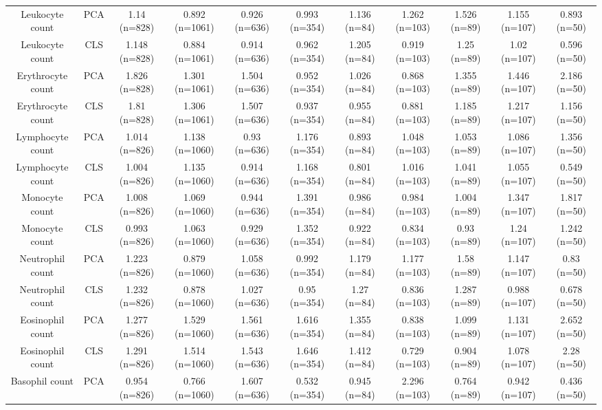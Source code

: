 \begin{landscape}
\begin{table}[!htbp]
\begin{tabular}{ ccccccccccc}
Leukocyte count & PCA & 1.14 (n=828) & 0.892 (n=1061) & 0.926 (n=636) & 0.993 (n=354) & 1.136 (n=84) & 1.262 (n=103) & 1.526 (n=89) & 1.155 (n=107) & 0.893 (n=50) \\ 
Leukocyte count & CLS & 1.148 (n=828) & 0.884 (n=1061) & 0.914 (n=636) & 0.962 (n=354) & 1.205 (n=84) & 0.919 (n=103) & 1.25 (n=89) & 1.02 (n=107) & 0.596 (n=50) \\ 
Erythrocyte count & PCA & 1.826 (n=828) & 1.301 (n=1061) & 1.504 (n=636) & 0.952 (n=354) & 1.026 (n=84) & 0.868 (n=103) & 1.355 (n=89) & 1.446 (n=107) & 2.186 (n=50) \\ 
Erythrocyte count & CLS & 1.81 (n=828) & 1.306 (n=1061) & 1.507 (n=636) & 0.937 (n=354) & 0.955 (n=84) & 0.881 (n=103) & 1.185 (n=89) & 1.217 (n=107) & 1.156 (n=50) \\ 
Lymphocyte count & PCA & 1.014 (n=826) & 1.138 (n=1060) & 0.93 (n=636) & 1.176 (n=354) & 0.893 (n=84) & 1.048 (n=103) & 1.053 (n=89) & 1.086 (n=107) & 1.356 (n=50) \\ 
Lymphocyte count & CLS & 1.004 (n=826) & 1.135 (n=1060) & 0.914 (n=636) & 1.168 (n=354) & 0.801 (n=84) & 1.016 (n=103) & 1.041 (n=89) & 1.055 (n=107) & 0.549 (n=50) \\ 
Monocyte count & PCA & 1.008 (n=826) & 1.069 (n=1060) & 0.944 (n=636) & 1.391 (n=354) & 0.986 (n=84) & 0.984 (n=103) & 1.004 (n=89) & 1.347 (n=107) & 1.817 (n=50) \\ 
Monocyte count & CLS & 0.993 (n=826) & 1.063 (n=1060) & 0.929 (n=636) & 1.352 (n=354) & 0.922 (n=84) & 0.834 (n=103) & 0.93 (n=89) & 1.24 (n=107) & 1.242 (n=50) \\ 
Neutrophil count & PCA & 1.223 (n=826) & 0.879 (n=1060) & 1.058 (n=636) & 0.992 (n=354) & 1.179 (n=84) & 1.177 (n=103) & 1.58 (n=89) & 1.147 (n=107) & 0.83 (n=50) \\ 
Neutrophil count & CLS & 1.232 (n=826) & 0.878 (n=1060) & 1.027 (n=636) & 0.95 (n=354) & 1.27 (n=84) & 0.836 (n=103) & 1.287 (n=89) & 0.988 (n=107) & 0.678 (n=50) \\ 
Eosinophil count & PCA & 1.277 (n=826) & 1.529 (n=1060) & 1.561 (n=636) & 1.616 (n=354) & 1.355 (n=84) & 0.838 (n=103) & 1.099 (n=89) & 1.131 (n=107) & 2.652 (n=50) \\ 
Eosinophil count & CLS & 1.291 (n=826) & 1.514 (n=1060) & 1.543 (n=636) & 1.646 (n=354) & 1.412 (n=84) & 0.729 (n=103) & 0.904 (n=89) & 1.078 (n=107) & 2.28 (n=50) \\ 
Basophil count & PCA & 0.954 (n=826) & 0.766 (n=1060) & 1.607 (n=636) & 0.532 (n=354) & 0.945 (n=84) & 2.296 (n=103) & 0.764 (n=89) & 0.942 (n=107) & 0.436 (n=50) \\ 

\end{tabular}
\end{table}
\end{landscape}
